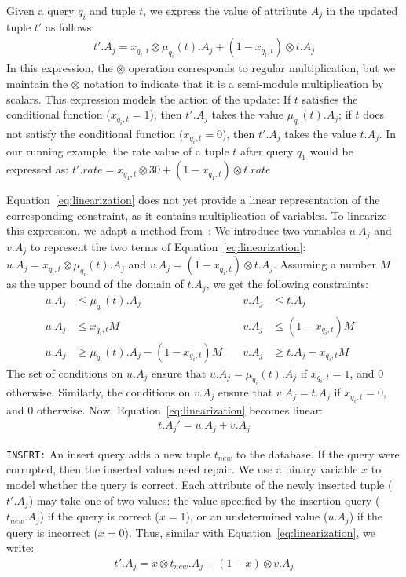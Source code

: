 Given a query $q_i$ and tuple $t$, we express the value of attribute $A_j$ in the updated tuple $t'$ as follows:
\begin{align}
\label{eq:linearization}
t'.A_j = x_{q_i, t}\otimes \mu_{q_i}(t).A_j + (1-x_{q_i, t})\otimes t.A_j 
\end{align} 
In this expression, the $\otimes$ operation corresponds to regular
multiplication, but we maintain the $\otimes$ notation to indicate
that it is a semi-module multiplication by scalars. This expression
models the action of the update: If $t$ satisfies the conditional
function ($x_{q_i, t}=1$), then $t'.A_j$ takes the value
$\mu_{q_i}(t).A_j$; if $t$ does not satisfy the conditional function
($x_{q_i, t}=0$), then $t'.A_j$ takes the value $t.A_j$.
In our running example, the rate value of a tuple $t$ after query $q_1$ would be expressed as:
$t'.rate = x_{q_1, t}\otimes 30 + (1-x_{q_1, t})\otimes t.rate $


Equation~\eqref{eq:linearization} does not yet provide a linear
representation of the corresponding constraint, as it contains
multiplication of variables. To linearize this expression, we adapt a
method from~\cite{integerProg}: We introduce two variables $u.A_j$ and
$v.A_j$ to represent the two terms of
Equation~\eqref{eq:linearization}: $u.A_j=x_{q_i, t}\otimes
\mu_{q_i}(t).A_j$ and $v.A_j=(1-x_{q_i, t})\otimes t.A_j$. Assuming a
number $M$ as the upper bound of the domain of $t.A_j$, we get the
following constraints:
{\scriptsize
\begin{align}
\label{eq:uv}
u.A_j &\leq \mu_{q_i}(t).A_j   &v.A_j &\leq t.A_j &\nonumber\\
u.A_j &\leq x_{q_i, t}M        &v.A_j &\leq (1-x_{q_i, t})M &\\
u.A_j &\geq \mu_{q_i}(t).A_j - (1-x_{q_i, t})M  \phantom{aa}
&v.A_j &\geq t.A_j - x_{q_i, t}M &\nonumber
\end{align}
}%
% 
The set of conditions on $u.A_j$ ensure that $u.A_j = \mu_{q_i}(t).A_j$ if $x_{q_i, t}=1$, and $0$ otherwise. Similarly, 
the conditions on $v.A_j$ ensure that $v.A_j = t.A_j$ if $x_{q_i, t}=0$, and $0$ otherwise.  
Now, Equation~\eqref{eq:linearization} becomes linear:
\begin{align}
\label{eq:tnew}
t.A_j' = u.A_j + v.A_j
\end{align}


\smallskip
\noindent
\texttt{INSERT:}
An insert query adds a new tuple $t_{new}$ to the database.  If the query were 
corrupted, then the inserted values need repair. We use a binary variable $x$ to model whether the query is correct.  Each attribute of the newly inserted tuple ($t'.A_j$) may take one of two values: the value specified by the insertion query ($t_{new}.A_j$) if the query is correct ($x=1$), or an undetermined value ($u.A_j$) if the query is incorrect ($x=0$).  Thus, similar with Equation~\eqref{eq:linearization}, we write:
\begin{eqnarray}
\label{eq:insert}
t'.A_j = x \otimes t_{new}.A_j + (1-x) \otimes v.A_j 
\end{eqnarray}


